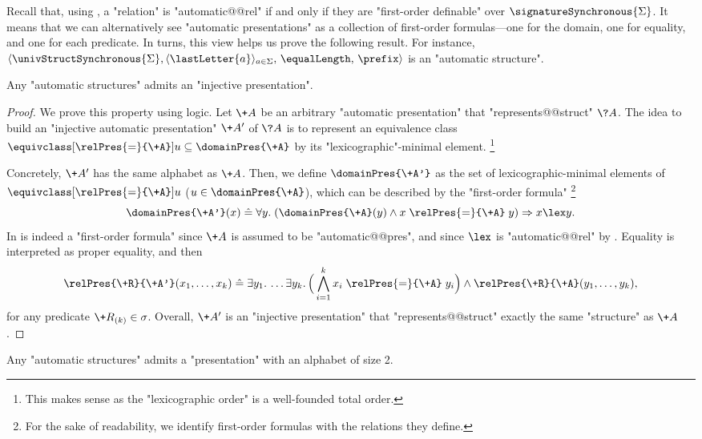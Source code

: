 Recall that, using , a "relation" is "automatic@@rel" 
if and only if they are "first-order definable" over $\signatureSynchronous{\Sigma}$.
It means that we can alternatively see "automatic presentations" as a
collection of first-order formulas---one for the domain, one for equality, and
one for each predicate. In turns, this view helps us prove the following result.
For instance, $\langle \univStructSynchronous{\Sigma}, \langle\lastLetter{a}\rangle_{a \in \Sigma},\, \equalLength,\, \prefix \rangle$ is an "automatic structure".


\begin{proposition}
	\AP\label{prop:making-presentations-injective}
	Any "automatic structures" admits an "injective presentation".
\end{proposition}

\begin{proof}
	We prove this property using logic. Let $\+A$ be an arbitrary "automatic presentation"
	that "represents@@struct" $\?A$. The idea to build an "injective automatic presentation" $\+A'$
	of $\?A$ is to represent an equivalence class $\equivclass[\relPres{=}{\+A}]{u} \subseteq
	\domainPres{\+A}$ by its "lexicographic"-minimal element.%
	\footnote{This makes sense as the "lexicographic order" is a well-founded total order.}

	Concretely, $\+A'$ has the same alphabet as $\+A$.
	Then, we define $\domainPres{\+A'}$ as the set of lexicographic-minimal elements of
	$\equivclass[\relPres{=}{\+A}]{u}$ ($u \in \domainPres{\+A}$),
	which can be described by the "first-order formula"%
	\footnote{For the sake of readability, we identify first-order formulas with the relations they define.}
	\[
		\domainPres{\+A'}(x) \defeq
		\forall y.\; (\domainPres{\+A}(y) \land x \mathrel{\relPres{=}{\+A}} y) \Rightarrow 
		x \lex y.
	\]
	In is indeed a "first-order formula" since $\+A$ is assumed to be "automatic@@pres",
	and since $\lex$ is "automatic@@rel" by .
	Equality is interpreted as proper equality,
	and then
	\[
		\relPres{\+R}{\+A'}(x_1,\hdots, x_k) \defeq
		\exists y_1.\,\hdots \exists y_k.\,
		\Big( \bigwedge_{i=1}^k x_i \mathrel{\relPres{=}{\+A}} y_i \Big)
		\land \relPres{\+R}{\+A}(y_1,\hdots, y_k),
	\]
	for any predicate $\+R_{(k)} \in \sigma$.
	Overall, $\+A'$ is an "injective presentation" that "represents@@struct" 
	exactly the same "structure" as $\+A$.
\end{proof}

\begin{proposition}
	\AP\label{prop:making-presentations-binary}
	Any "automatic structures" admits a "presentation" with an alphabet of size 2.
\end{proposition}

